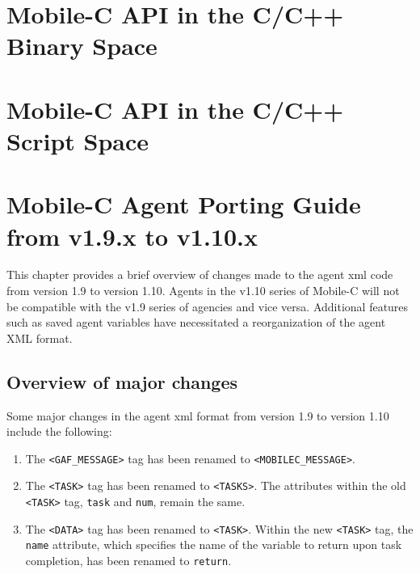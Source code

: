 \documentclass[11pt]{report}
\begin{document}
{%

%

\pagebreak

\appendix
\chapter{Mobile-C API in the C/C++ Binary Space \label {appendix}}

\chapter{Mobile-C API in the C/C++ Script Space \label {appendixb}}

\pagebreak

\chapter{Mobile-C Agent Porting Guide from v1.9.x to v1.10.x}
This chapter provides a brief overview of changes made to the agent
xml code from version 1.9 to version 1.10. Agents in the v1.10 series
of Mobile-C will not be compatible with the v1.9 series of agencies
and vice versa. Additional features such as saved agent variables have
necessitated a reorganization of the agent XML format. 

\section{Overview of major changes}
Some major changes in the agent xml format from version 1.9 to version 
1.10 include the following:
\begin{enumerate}
\item The \texttt{<GAF\_MESSAGE>} tag has been renamed to
  \texttt{<MOBILEC\_MESSAGE>}.
\item The \texttt{<TASK>} tag has been renamed to \texttt{<TASKS>}. 
  The attributes within the old \texttt{<TASK>} tag, \texttt{task} and
  \texttt{num}, remain the same.
\item The \texttt{<DATA>} tag has been renamed to \texttt{<TASK>}. Within
the new \texttt{<TASK>} tag, the \texttt{name} attribute, which specifies
the name of the variable to return upon task completion, has been renamed 
to \texttt{return}. 
\end{enumerate}

}
\end{document}
